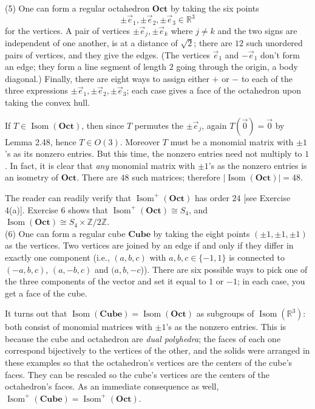 \documentclass[leqno]{book}
\begin{document}
(5) One can form a regular octahedron $\mathbf{Oct}$ by taking the six points
$$\pm\vec e_1,\pm\vec e_2,\pm\vec e_3\in\mathbb R^3$$
for the vertices.  A pair of vertices $\pm\vec e_j,\pm\vec e_k$ where $j\ne k$ and the two signs are independent of one another, is at a distance of $\sqrt 2$; there are $12$ such unordered pairs of vertices, and they give the edges.  (The vertices $\vec e_1$ and $-\vec e_1$ don't form an edge; they form a line segment of length $2$ going through the origin, a body diagonal.)  Finally, there are eight ways to assign either $+$ or $-$ to each of the three expressions $\pm\vec e_1,\pm\vec e_2,\pm\vec e_3$; each case gives a face of the octahedron upon taking the convex hull.

If $T\in\operatorname{Isom}(\mathbf{Oct})$, then since $T$ permutes the $\pm\vec e_j$, again $T(\vec 0)=\vec 0$ by Lemma 2.48, hence $T\in O(3)$.  Moreover $T$ must be a monomial matrix with $\pm 1$'s as its nonzero entries.  But this time, the nonzero entries need not multiply to $1$.  In fact, it is clear that \emph{any} monomial matrix with $\pm 1$'s as the nonzero entries is an isometry of $\mathbf{Oct}$.  There are $48$ such matrices; therefore $|\operatorname{Isom}(\mathbf{Oct})|=48$.

The reader can readily verify that $\operatorname{Isom}^+(\mathbf{Oct})$ has order $24$ [see Exercise 4(a)].  Exercise 6 shows that $\operatorname{Isom}^+(\mathbf{Oct})\cong S_4$, and $\operatorname{Isom}(\mathbf{Oct})\cong S_4\times\mathbb Z/2\mathbb Z$.\\

(6) One can form a regular cube $\mathbf{Cube}$ by taking the eight points $(\pm 1,\pm 1,\pm 1)$ as the vertices.  Two vertices are joined by an edge if and only if they differ in exactly one component (i.e., $(a,b,c)$ with $a,b,c\in\{-1,1\}$ is connected to $(-a,b,c)$, $(a,-b,c)$ and $(a,b,-c$)).  There are six possible ways to pick one of the three components of the vector and set it equal to $1$ or $-1$; in each case, you get a face of the cube.

It turns out that $\operatorname{Isom}(\mathbf{Cube})=\operatorname{Isom}(\mathbf{Oct})$ as subgroups of $\operatorname{Isom}(\mathbb R^3)$: both consist of monomial matrices with $\pm 1$'s as the nonzero entries.  This is because the cube and octahedron are \emph{dual polyhedra}; the faces of each one correspond bijectively to the vertices of the other, and the solids were arranged in these examples so that the octahedron's vertices are the centers of the cube's faces.  They can be rescaled so the cube's vertices are the centers of the octahedron's faces.  As an immediate consequence as well, $\operatorname{Isom}^+(\mathbf{Cube})=\operatorname{Isom}^+(\mathbf{Oct})$.
\end{document}
